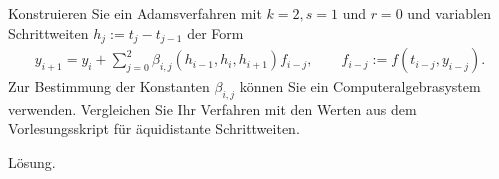 \begin{exercise}
Konstruieren Sie ein Adamsverfahren mit $k = 2, s = 1$ und $r = 0$ und variablen
Schrittweiten $h_j := t_j - t_{j-1}$ der Form
\begin{align}
  y_{i+1} = y_i + \sum_{j=0}^2 \beta_{i,j}(h_{i-1},h_i,h_{i+1})f_{i-j},
  \qquad f_{i-j} := f(t_{i-j},y_{i-j}).
\end{align}
Zur Bestimmung der Konstanten $\beta_{i,j}$ können Sie ein Computeralgebrasystem
verwenden. Vergleichen Sie Ihr Verfahren mit den Werten aus dem Vorlesungsskript
für äquidistante Schrittweiten.
\end{exercise}
\begin{solution}
Lösung.
\end{solution}
